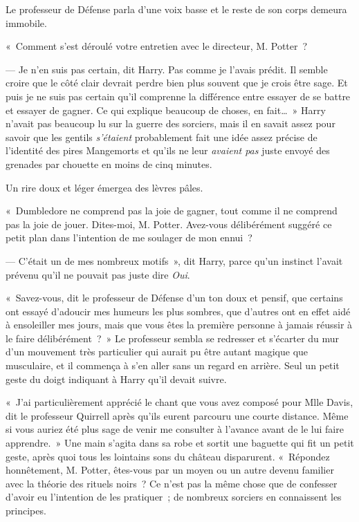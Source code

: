 Le professeur de Défense parla d'une voix basse et le reste de son corps demeura immobile.

«~Comment s'est déroulé votre entretien avec le directeur, M. Potter~?

--- Je n'en suis pas certain, dit Harry.
Pas comme je l'avais prédit.
Il semble croire que le côté clair devrait perdre bien plus souvent que je crois être sage.
Et puis je ne suis pas certain qu'il comprenne la différence entre essayer de se battre et essayer de gagner.
Ce qui explique beaucoup de choses, en fait…~»
Harry n'avait pas beaucoup lu sur la guerre des sorciers, mais il en savait assez pour savoir que les gentils \emph{s'étaient} probablement fait une idée assez précise de l'identité des pires Mangemorts et qu'ils ne leur \emph{avaient pas} juste envoyé des grenades par chouette en moins de cinq minutes.

Un rire doux et léger émergea des lèvres pâles.

«~Dumbledore ne comprend pas la joie de gagner, tout comme il ne comprend pas la joie de jouer.
Dites-moi, M. Potter.
Avez-vous délibérément suggéré ce petit plan dans l'intention de me soulager de mon ennui~?

--- C'était un de mes nombreux motifs~», dit Harry, parce qu'un instinct l'avait prévenu qu'il ne pouvait pas juste dire \emph{Oui}.

«~Savez-vous, dit le professeur de Défense d'un ton doux et pensif, que certains ont essayé d'adoucir mes humeurs les plus sombres, que d'autres ont en effet aidé à ensoleiller mes jours, mais que vous êtes la première personne à jamais réussir à le faire délibérément~?~»
Le professeur sembla se redresser et s'écarter du mur d'un mouvement très particulier qui aurait pu être autant magique que musculaire, et il commença à s'en aller sans un regard en arrière.
Seul un petit geste du doigt indiquant à Harry qu'il devait suivre.

«~J'ai particulièrement apprécié le chant que vous avez composé pour Mlle Davis, dit le professeur Quirrell après qu'ils eurent parcouru une courte distance.
Même si vous auriez été plus sage de venir me consulter à l'avance avant de le lui faire apprendre.~»
Une main s'agita dans sa robe et sortit une baguette qui fit un petit geste, après quoi tous les lointains sons du château disparurent.
«~Répondez honnêtement, M. Potter, êtes-vous par un moyen ou un autre devenu familier avec la théorie des rituels noirs~?
Ce n'est pas la même chose que de confesser d'avoir eu l'intention de les pratiquer~; de nombreux sorciers en connaissent les principes.

